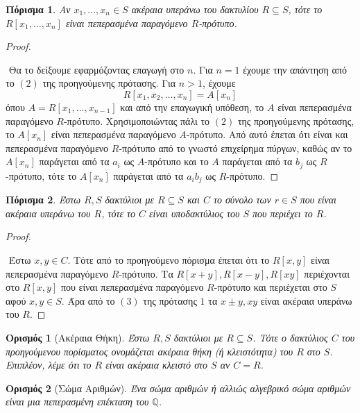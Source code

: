 \documentclass[oneside,a4paper]{article}
\newtheorem*{defn}{Ορισμός}
\newtheorem{cor}{Πόρισμα}
\newcommand{\Q}{\mathbb{Q}}
\begin{document}
\begin{cor}
	Αν $x_1,\ldots,x_n \in S$ ακέραια υπεράνω του δακτυλίου $R \subseteq S$, τότε το $R[x_1,\ldots,x_n]$ είναι πεπερασμένα παραγόμενο $R$-πρότυπο.
\end{cor}
\vspace*{0.1cm}
\begin{proof} $ $

	$ $\newline
	Θα το δείξουμε εφαρμόζοντας επαγωγή στο $n$. Για $n=1$ έχουμε την απάντηση από το $(2)$ της προηγούμενης πρότασης. Για $n>1$, έχουμε $$R[x_1,x_2,\ldots,x_n] = A [x_n]$$ όπου $A = R[x_1,\ldots,x_{n-1}]$ και από την επαγωγική υπόθεση, το $A$ είναι πεπερασμένα παραγόμενο $R$-πρότυπο. Χρησιμοποιώντας πάλι το $(2)$ της προηγούμενης πρότασης, το $A[x_n]$ είναι πεπερασμένα παραγόμενο $A$-πρότυπο. Από αυτό έπεται ότι είναι και πεπερασμένα παραγόμενο $R$-πρότυπο από το γνωστό επιχείρημα πύργων, καθώς αν το $A[x_n]$ παράγεται από τα $a_i$ ως $A$-πρότυπο και το $A$ παράγεται από τα $b_j$ ως $R$-πρότυπο, τότε το $A[x_n]$ παράγεται από τα $a_i b_j$ ως $R$-πρότυπο.
\end{proof}

\begin{cor}
	Έστω $R,S$ δακτύλιοι με $R\subseteq S$ και $C$ το σύνολο των $r \in S$ που είναι ακέραια υπεράνω του $R$, τότε το $C$ είναι υποδακτύλιος του $S$ που περιέχει το $R$. 
\end{cor}
\vspace*{0.1cm}
\begin{proof} $ $

	$ $\newline
	Έστω $x,y \in C$. Τότε από το προηγούμενο πόρισμα έπεται ότι το $R[x,y]$ είναι πεπερασμένα παραγόμενο $R$-πρότυπο.  Τα $R[x+y],R[x-y],R[xy]$ περιέχονται στο $R[x,y]$ που είναι πεπερασμένα παραγόμενο $R$-πρότυπο και περιέχεται στο $S$ αφού $x,y \in S$. Άρα από το $(3)$ της πρότασης $1$ τα $x\pm y,xy$ είναι ακέραια υπεράνω του $R$.

\end{proof}
\begin{defn}[Ακέραια Θήκη] 
	Έστω $R,S$ δακτύλιοι με $R \subseteq S$. Τότε ο δακτύλιος $C$ του προηγούμενου πορίσματος ονομάζεται ακέραια θήκη (ή κλειστότητα) του $R$ στο $S$. Επιπλέον, λέμε ότι το $R$ είναι ακέραια κλειστό στο $S$ αν $C=R$.
\end{defn}

\begin{defn}[Σώμα Αριθμών]
	Ένα σώμα αριθμών ή αλλιώς αλγεβρικό σώμα αριθμών είναι μια πεπερασμένη επέκταση του $\Q$.
\end{defn}
\end{document}
